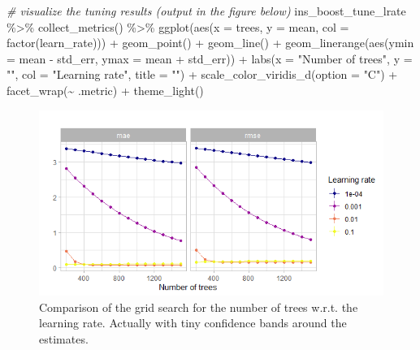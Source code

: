 \documentclass[
]{book}
\newenvironment{Shaded}{\begin{snugshade}}{\end{snugshade}}
\newcommand{\AttributeTok}[1]{\textcolor[rgb]{0.77,0.63,0.00}{#1}}
\newcommand{\CommentTok}[1]{\textcolor[rgb]{0.56,0.35,0.01}{\textit{#1}}}
\newcommand{\FunctionTok}[1]{\textcolor[rgb]{0.00,0.00,0.00}{#1}}
\newcommand{\NormalTok}[1]{#1}
\newcommand{\SpecialCharTok}[1]{\textcolor[rgb]{0.00,0.00,0.00}{#1}}
\newcommand{\StringTok}[1]{\textcolor[rgb]{0.31,0.60,0.02}{#1}}
\begin{document}
\begin{Shaded}
\begin{Highlighting}[]
\CommentTok{\# visualize the tuning results (output in the figure below)}
\NormalTok{ins\_boost\_tune\_lrate }\SpecialCharTok{\%\textgreater{}\%}
  \FunctionTok{collect\_metrics}\NormalTok{() }\SpecialCharTok{\%\textgreater{}\%}
  \FunctionTok{ggplot}\NormalTok{(}\FunctionTok{aes}\NormalTok{(}\AttributeTok{x =}\NormalTok{ trees, }\AttributeTok{y =}\NormalTok{ mean, }\AttributeTok{col =} \FunctionTok{factor}\NormalTok{(learn\_rate))) }\SpecialCharTok{+}
  \FunctionTok{geom\_point}\NormalTok{() }\SpecialCharTok{+}
  \FunctionTok{geom\_line}\NormalTok{() }\SpecialCharTok{+}
  \FunctionTok{geom\_linerange}\NormalTok{(}\FunctionTok{aes}\NormalTok{(}\AttributeTok{ymin =}\NormalTok{ mean }\SpecialCharTok{{-}}\NormalTok{ std\_err, }\AttributeTok{ymax =}\NormalTok{ mean }\SpecialCharTok{+}\NormalTok{ std\_err)) }\SpecialCharTok{+}
  \FunctionTok{labs}\NormalTok{(}\AttributeTok{x =} \StringTok{"Number of trees"}\NormalTok{, }\AttributeTok{y =} \StringTok{""}\NormalTok{, }\AttributeTok{col =} \StringTok{"Learning rate"}\NormalTok{,}
       \AttributeTok{title =} \StringTok{""}\NormalTok{) }\SpecialCharTok{+}
  \FunctionTok{scale\_color\_viridis\_d}\NormalTok{(}\AttributeTok{option =} \StringTok{"C"}\NormalTok{) }\SpecialCharTok{+}
  \FunctionTok{facet\_wrap}\NormalTok{(}\SpecialCharTok{\textasciitilde{}}\NormalTok{ .metric) }\SpecialCharTok{+}
  \FunctionTok{theme\_light}\NormalTok{()}
\end{Highlighting}
\end{Shaded}

\begin{figure}

{\centering \includegraphics[width=0.7\linewidth]{_pictures/boost_ins_tune_lrate} 

}

\caption{Comparison of the grid search for the number of trees w.r.t. the learning rate. Actually with tiny confidence bands around the estimates.}\label{fig:boostInstuneplotlrate}
\end{figure}
\end{document}
